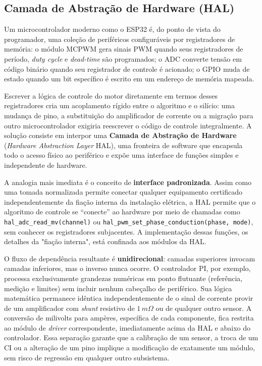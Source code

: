 \subsection{Camada de Abstração de Hardware (HAL)}

Um microcontrolador moderno como o ESP32 é, do ponto de vista do programador, uma coleção de periféricos configuráveis por registradores de memória: o módulo MCPWM gera sinais PWM quando seus registradores de período, \textit{duty cycle} e \textit{dead-time} são programados; o ADC converte tensão em código binário quando seu registrador de controle é acionado; o GPIO muda de estado quando um bit específico é escrito em um endereço de memória mapeada.

Escrever a lógica de controle do motor diretamente em termos desses registradores cria um acoplamento rígido entre o algoritmo e o silício: uma mudança de pino, a substituição do amplificador de corrente ou a migração para outro microcontrolador exigiria reescrever o código de controle integralmente. A solução consiste em interpor uma \textbf{Camada de Abstração de Hardware} (\textit{Hardware Abstraction Layer}  HAL), uma fronteira de software que encapsula todo o acesso físico ao periférico e expõe uma interface de funções simples e independente de hardware.

A analogia mais imediata é o conceito de \textbf{interface padronizada}. Assim como uma tomada normalizada permite conectar qualquer equipamento certificado independentemente da fiação interna da instalação elétrica, a HAL permite que o algoritmo de controle se ``conecte'' ao hardware por meio de chamadas como \texttt{hal\_adc\_read\_mv(channel)} ou \texttt{hal\_pwm\_set\_phase\_conduction(phase, mode)}, sem conhecer os registradores subjacentes. A implementação dessas funções, os detalhes da "fiação interna", está confinada aos módulos da HAL.

O fluxo de dependência resultante é \textbf{unidirecional}: camadas superiores invocam camadas inferiores, mas o inverso nunca ocorre. O controlador PI, por exemplo, processa exclusivamente grandezas numéricas em ponto flutuante (referência, medição e limites) sem incluir nenhum cabeçalho de periférico. Sua lógica matemática permanece idêntica independentemente de o sinal de corrente provir de um amplificador com \textit{shunt} resistivo de $1\,m\Omega$ ou de qualquer outro sensor. A conversão de milivolts para ampères, específica de cada componente, fica restrita ao módulo de \textit{driver} correspondente, imediatamente acima da HAL e abaixo do controlador. Essa separação garante que a calibração de um sensor, a troca de um CI ou a alteração de um pino implique a modificação de exatamente um módulo, sem risco de regressão em qualquer outro subsistema.

